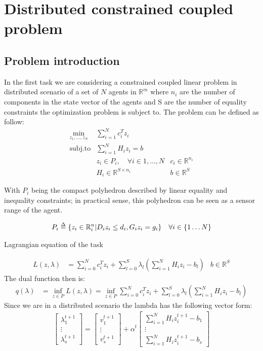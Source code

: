 \documentclass{article}
\def\delequal{\mathrel{\ensurestackMath{\stackon[1pt]{=}{\scriptstyle\Delta}}}}
\begin{document}
\section{Distributed constrained coupled problem }

\subsection {Problem introduction}
In the first task we are considering a constrained coupled linear problem in distributed scenario of a set of ${N}$ agents in ${\mathbb R}^m$ where ${n_i}$ are the number of components in the state vector of the agents and S are the number of equality constraints the optimization problem is subject to. 
The problem can be defined as follow:
\begin{align}
  \min_{z_1,...,z_N} & \sum_{i=1}^{N} c_i^Tz_i \\
  \text{subj.to} &\sum_{i=1}^{N} H_iz_i=b  \\
  & z_i\in P_i , \quad \forall i \in {1,\dots, N}
  & c_i \in {\mathbb R}^{n_i}\\
  & H_i \in {\mathbb R}^{S\times n_i} 
  & b\in {\mathbb R}^S
\end{align}

\noindent With $P_i$ being the compact polyhedron described by linear equality and inequality constraints; in practical sense, this polyhedron can be seen as a sensor range of the agent.

\begin{align}
    P_i &\delequal \{z_i \in {\mathbb R}^n_i | D_i z_i \leq d_i, G_i z_i = g_i\} & \forall i \in \{1\dots N\}
\end{align}

\noindent Lagrangian equation of the task

\begin{align}
    L(z,\lambda) &= \sum_{i=0}^{N} c_i^T z_i + \sum_{l=0}^{S}\lambda_l(\sum_{i=1}^{N}H_i z_i-b_l) & b \in {\mathbb R}^S
\end{align}
The dual function then is:
\begin{align}
    q(\lambda) &= \inf_{z\in P}L(z,\lambda) = \inf_{z\in P} \sum_{i=0}^{N} c_i^T z_i + \sum_{l=0}^{S}\lambda_l(\sum_{i=1}^{N}H_i z_i-b_l)
\end{align}
Since we are in a distributed scenario the lambda has the following vector form:
\begin{gather}
 \begin{bmatrix} \lambda_1^{t+1} \\ \vdots \\ \lambda_s^{t+1} \end{bmatrix} 
 =
 \begin{bmatrix} v_1^{t+1} \\ \vdots \\ v_s^{t+1} \end{bmatrix} +\alpha^t \begin{bmatrix} \sum_{i=1}^{N}H_i z_i^{t+1}-b_1 \\ \vdots \\ \sum_{i=1}^{N}H_i z_i^{t+1}-b_s \end{bmatrix} 
\end{gather}
 
\end{document}

